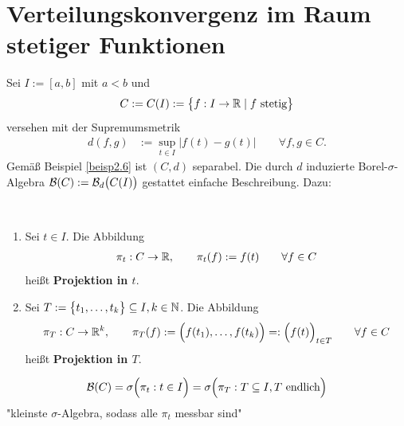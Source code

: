 
\section{Verteilungskonvergenz im Raum stetiger Funktionen} %
Sei $I:=[a,b]$ mit $a<b$ und
\begin{align*}
	C:=C(I):=\big\lbrace f:I\to\mathbb{R}\mid f\text{ stetig}\big\rbrace
\end{align*}
versehen mit der Supremumsmetrik
\begin{align*}
	d(f,g)&:=\sup\limits_{t\in I}\big|f(t)-g(t)\big|\qquad\forall f,g\in C.
\end{align*}
Gemäß Beispiel \ref{beisp2.6} ist $(C,d)$ separabel. 
Die durch $d$ induzierte Borel-$\sigma$-Algebra
$\mathcal{B}(C):=\mathcal{B}_d\big(C(I)\big)$
gestattet einfache Beschreibung. 
Dazu:

\begin{definition}\ %
	\begin{enumerate}[label=(\arabic*)]
		\item Sei $t\in I$. Die Abbildung 
		\begin{align*}
			\pi_t:C\to\mathbb{R},\qquad\pi_t(f):=f(t)\qquad\forall f\in C
		\end{align*}
		heißt \textbf{Projektion in $t$}.
		\item Sei $T:=\big\lbrace t_1,\ldots,t_k\big\rbrace\subseteq I,k\in\mathbb{N}$. Die Abbildung
		\begin{align*}
			\pi_T:C\to\mathbb{R}^k,\qquad \pi_T(f):=\Big(f(t_1),\ldots,f(t_k)\Big)=:
			\Big(f(t)\Big)_{t\in T}\qquad\forall f\in C
		\end{align*}
		heißt \textbf{Projektion in $T$}.
	\end{enumerate}
\end{definition}

\begin{satz}\label{satz7.2}
	\begin{align*}
		\mathcal{B}(C)
		=\sigma\Big(\pi_t:t\in I\Big)=\sigma\Big(\pi_T:T\subseteq I,T\text{ endlich}\Big)
	\end{align*}
	"kleinste $\sigma$-Algebra, sodass alle $\pi_t$ messbar sind"
\end{satz}

